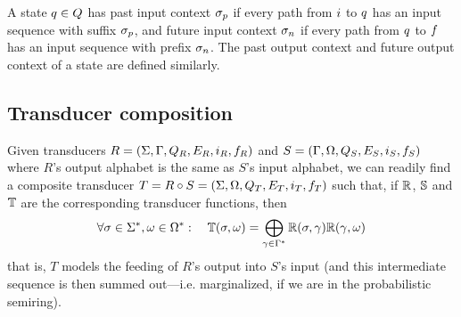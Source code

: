 \documentclass[english]{article}
\begin{document}
A state $q \in Q$ has past input context $\sigma_p$ if every path from $i$ to $q$ has an input sequence with suffix $\sigma_p$,
and future input context $\sigma_n$ if every path from $q$ to $f$ has an input sequence with prefix $\sigma_n$.
The past output context and future output context of a state are defined similarly.

\subsection{Transducer composition}

Given transducers
 $R = (\Sigma, \Gamma, Q_R, E_R, i_R, f_R)$ and
 $S = (\Gamma, \Omega, Q_S, E_S, i_S, f_S)$
where $R$'s output alphabet is the same as $S$'s input alphabet,
we can readily find a composite transducer
 $T = R \circ S = (\Sigma, \Omega, Q_T, E_T, i_T, f_T)$
such that, if $\mathbb{R}$, $\mathbb{S}$ and $\mathbb{T}$ are the corresponding transducer functions,
then
\[
\forall \sigma \in {\Sigma}^{\ast}, \omega \in {\Omega}^{\ast}:
\quad
\mathbb{T}(\sigma,\omega) = \bigoplus_{\gamma \in {\Gamma}^{\ast}} \mathbb{R}(\sigma,\gamma) \mathbb{R}(\gamma,\omega)
\]
that is, $T$ models the feeding of $R$'s output into $S$'s input
(and this intermediate sequence is then summed out---i.e. marginalized, if we are in the probabilistic semiring).
\end{document}
